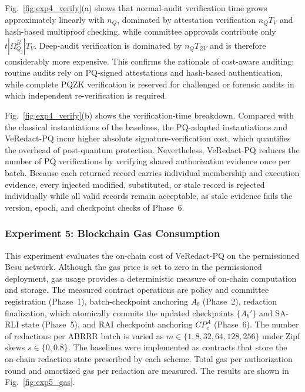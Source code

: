 \documentclass[lettersize,journal]{IEEEtran}
\begin{document}
Fig.~\ref{fig:exp4_verify}(a) shows that normal-audit verification time
grows approximately linearly with $n_Q$, dominated by attestation
verification $n_QT_V$ and hash-based multiproof checking, while committee
approvals contribute only $t|\Omega_{Q_j}^B|T_V$. Deep-audit verification
is dominated by $n_QT_{ZV}$ and is therefore considerably more
expensive. This confirms the rationale of cost-aware auditing: routine
audits rely on PQ-signed attestations and hash-based authentication,
while complete PQZK verification is reserved for challenged or forensic
audits in which independent re-verification is required.

Fig.~\ref{fig:exp4_verify}(b) shows the verification-time breakdown.
Compared with the classical instantiations of the baselines, the
PQ-adapted instantiations and VeRedact-PQ incur higher absolute
signature-verification cost, which quantifies the overhead of
post-quantum protection. Nevertheless, VeRedact-PQ reduces the number
of PQ verifications by verifying shared authorization evidence once per
batch. Because each returned record carries individual membership and
execution evidence, every injected modified, substituted, or stale
record is rejected individually while all valid records remain
acceptable, as stale evidence fails the version, epoch, and checkpoint
checks of Phase~6.

\subsubsection*{\textbf{Experiment 5: Blockchain Gas Consumption}}

This experiment evaluates the on-chain cost of VeRedact-PQ on the
permissioned Besu network. Although the gas price is set to zero in the
permissioned deployment, gas usage provides a deterministic measure of
on-chain computation and storage. The measured contract operations are
policy and committee registration (Phase~1), batch-checkpoint anchoring
$A_b$ (Phase~2), redaction finalization, which atomically commits the
updated checkpoints $\{A_b'\}$ and SA-RLI state (Phase~5), and RAI
checkpoint anchoring $CP_e^A$ (Phase~6). The number of redactions per
ABRRR batch is varied as $m\in\{1,8,32,64,128,256\}$ under Zipf skews
$s\in\{0,0.8\}$. The baselines were implemented as contracts that store
the on-chain redaction state prescribed by each scheme. Total gas per
authorization round and amortized gas per redaction are measured. The
results are shown in Fig.~\ref{fig:exp5_gas}.
\end{document}

